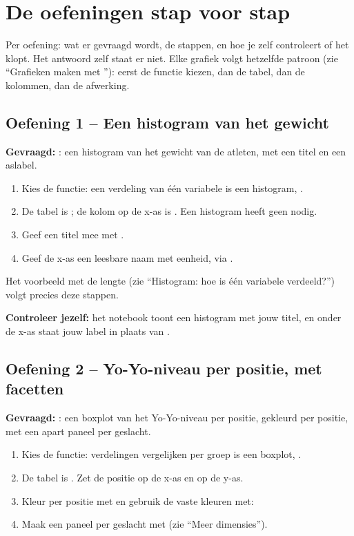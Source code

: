 \documentclass[11pt,a4paper]{article}
\begin{document}
\section{De oefeningen stap voor stap}

Per oefening: wat er gevraagd wordt, de stappen, en hoe je zelf
controleert of het klopt. Het antwoord zelf staat er niet. Elke grafiek
volgt hetzelfde patroon (zie ``Grafieken maken met
''): eerst de functie kiezen, dan de tabel, dan de
kolommen, dan de afwerking.

\subsection*{Oefening 1 -- Een histogram van het gewicht}

\textbf{Gevraagd:} : een histogram van het gewicht
van de atleten, met een titel en een aslabel.

\begin{enumerate}
  \item Kies de functie: een verdeling van één variabele is een
        histogram, .
  \item De tabel is ; de kolom op de x-as is
        . Een histogram heeft geen  nodig.
  \item Geef een titel mee met .
  \item Geef de x-as een leesbare naam met eenheid, via
        .
\end{enumerate}

Het voorbeeld met de lengte (zie ``Histogram: hoe is één variabele
verdeeld?'') volgt precies deze stappen.

\textbf{Controleer jezelf:} het notebook toont een histogram met jouw
titel, en onder de x-as staat jouw label in plaats van
.

\subsection*{Oefening 2 -- Yo-Yo-niveau per positie, met facetten}

\textbf{Gevraagd:} : een boxplot van het Yo-Yo-niveau
per positie, gekleurd per positie, met een apart paneel per geslacht.

\begin{enumerate}
  \item Kies de functie: verdelingen vergelijken per groep is een
        boxplot, .
  \item De tabel is . Zet de positie op de x-as en
         op de y-as.
  \item Kleur per positie met  en gebruik de vaste
        kleuren met:\newline {}
  \item Maak een paneel per geslacht met  (zie
        ``Meer dimensies'').
\end{enumerate}
\end{document}
